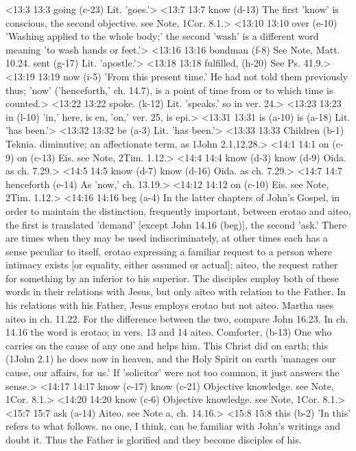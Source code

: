 <13:3 13:3  going (c-23)  Lit. 'goes.'>
<13:7 13:7  know (d-13)  The first 'know' is conscious, the second objective. see  Note, 1Cor. 8.1.>
<13:10 13:10  over (e-10)  'Washing applied to the whole body;' the second 'wash' is a  different word meaning 'to wash hands or feet.'>
<13:16 13:16  bondman (f-8)  See Note, Matt. 10.24.
  sent (g-17)  Lit. 'apostle.'>
<13:18 13:18  fulfilled, (h-20)  See Ps. 41.9.>
<13:19 13:19  now (i-5)  'From this present time.' He had not told them previously  thus; 'now' ('henceforth,' ch. 14.7), is a point of time from  or to which time is counted.>
<13:22 13:22  spoke. (k-12)  Lit. 'speaks.' so in ver. 24.>
<13:23 13:23  in (l-10)  'in,' here, is en, 'on,' ver. 25, is epi.>
<13:31 13:31  is (a-10)  is (a-18)
 Lit. 'has been.'>
<13:32 13:32  be (a-3)  Lit. 'has been.'>
<13:33 13:33  Children (b-1)  Teknia. diminutive; an affectionate term, as 1John  2.1,12,28.>
<14:1 14:1  on (c-9)  on (c-13)
  Eis. see Note, 2Tim. 1.12.>
<14:4 14:4  know (d-3)  know (d-9)
 Oida. as ch. 7.29.>
<14:5 14:5  know (d-7)  know (d-16)
  Oida. as ch. 7.29.>
<14:7 14:7  henceforth (e-14)  As 'now,' ch. 13.19.>
<14:12 14:12  on (c-10)  Eis. see Note, 2Tim. 1.12.>
<14:16 14:16  beg (a-4)  In the latter chapters of John's Gospel, in order to maintain  the distinction, frequently important, between erotao and  aiteo, the first is translated 'demand' [except John 14.16  (beg)], the second 'ask.' There are times when they may be used  indiscriminately, at other times each has a sense peculiar to  itself. erotao expressing a familiar request to a person  where intimacy exists [or equality, either assumed or actual];  aiteo, the request rather for something by an inferior to his  superior. The disciples employ both of these words in their  relations with Jesus, but only aiteo with relation to the  Father. In his relations with his Father, Jesus employs  erotao but not aiteo. Martha uses aiteo in ch. 11.22. For  the difference between the two, compare John 16.23. In ch.  14.16 the word is erotao; in vers. 13 and 14 aiteo.
 Comforter, (b-13)  One who carries on the cause of any one and helps him. This  Christ did on earth; this (1John 2.1) he does now in heaven,  and the Holy Spirit on earth 'manages our cause, our affairs,  for us.' If 'solicitor' were not too common, it just answers  the sense.>
<14:17 14:17  know (c-17)  know (c-21)
 Objective knowledge. see Note, 1Cor. 8.1.>
<14:20 14:20  know (c-6)  Objective knowledge. see Note, 1Cor. 8.1.>
<15:7 15:7  ask (a-14)  Aiteo. see Note a, ch. 14.16.>
<15:8 15:8  this (b-2)  'In this' refers to what follows. no one, I think, can be  familiar with John's writings and doubt it. Thus the Father  is glorified and they become disciples of his.

